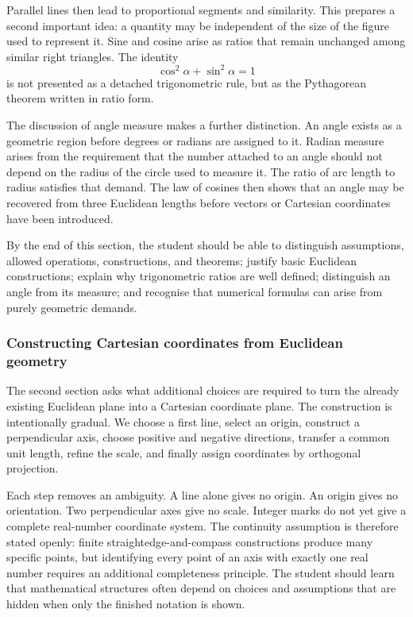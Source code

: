 Parallel lines then lead to proportional segments and similarity. This prepares
a second important idea: a quantity may be independent of the size of the figure
used to represent it. Sine and cosine arise as ratios that remain unchanged among
similar right triangles. The identity
\[
\cos^2\alpha+\sin^2\alpha=1
\]
is not presented as a detached trigonometric rule, but as the Pythagorean theorem
written in ratio form.

The discussion of angle measure makes a further distinction. An angle exists as
a geometric region before degrees or radians are assigned to it. Radian measure
arises from the requirement that the number attached to an angle should not
depend on the radius of the circle used to measure it. The ratio of arc length to
radius satisfies that demand. The law of cosines then shows that an angle may be
recovered from three Euclidean lengths before vectors or Cartesian coordinates
have been introduced.

By the end of this section, the student should be able to distinguish assumptions,
allowed operations, constructions, and theorems; justify basic Euclidean
constructions; explain why trigonometric ratios are well defined; distinguish an
angle from its measure; and recognise that numerical formulas can arise from
purely geometric demands.

\subsubsection*{Constructing Cartesian coordinates from Euclidean geometry}

The second section asks what additional choices are required to turn the already
existing Euclidean plane into a Cartesian coordinate plane. The construction is
intentionally gradual. We choose a first line, select an origin, construct a
perpendicular axis, choose positive and negative directions, transfer a common
unit length, refine the scale, and finally assign coordinates by orthogonal
projection.

Each step removes an ambiguity. A line alone gives no origin. An origin gives no
orientation. Two perpendicular axes give no scale. Integer marks do not yet give
a complete real-number coordinate system. The continuity assumption is therefore
stated openly: finite straightedge-and-compass constructions produce many
specific points, but identifying every point of an axis with exactly one real
number requires an additional completeness principle. The student should learn
that mathematical structures often depend on choices and assumptions that are
hidden when only the finished notation is shown.


